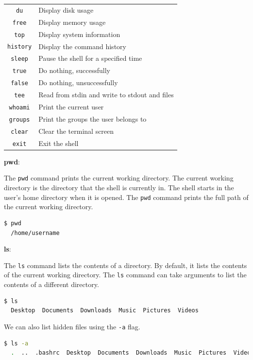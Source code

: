\begin{table}[h!]
\begin{tabular}{ c l }
  \texttt{du} & Display disk usage \\
  \texttt{free} & Display memory usage \\
  \texttt{top} & Display system information \\
  \texttt{history} & Display the command history \\
  \texttt{sleep} & Pause the shell for a specified time \\
  \texttt{true} & Do nothing, successfully \\
  \texttt{false} & Do nothing, unsuccessfully \\
  \texttt{tee} & Read from stdin and write to stdout and files \\
  \texttt{whoami} & Print the current user \\
  \texttt{groups} & Print the groups the user belongs to \\
  \texttt{clear} & Clear the terminal screen \\
  \texttt{exit} & Exit the shell \\
  \bottomrule
\end{tabular}
\end{table}

\textbf{pwd}:

The \texttt{pwd} command prints the current working directory. The current working directory is the directory that the shell is currently in. The shell starts in the user's home directory when it is opened. The \texttt{pwd} command prints the full path of the current working directory.

\begin{lstlisting}[language=bash]
  $ pwd
  /home/username
\end{lstlisting}

\textbf{ls}:

The \texttt{ls} command lists the contents of a directory. By default, it lists the contents of the current working directory. The \texttt{ls} command can take arguments to list the contents of a different directory.

\begin{lstlisting}[language=bash]
  $ ls
  Desktop  Documents  Downloads  Music  Pictures  Videos
\end{lstlisting}

We can also list hidden files
using the \texttt{-a} flag.

\begin{lstlisting}[language=bash]
  $ ls -a
  .  ..  .bashrc  Desktop  Documents  Downloads  Music  Pictures  Videos
\end{lstlisting}


